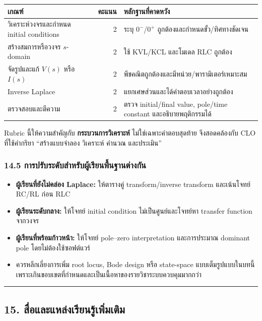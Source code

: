 \begin{table}[htbp]
    \centering
    \begin{tabularx}{\textwidth}{L{0.34\textwidth} r Y}
        \hline
        \textbf{เกณฑ์} & \textbf{คะแนน} & \textbf{หลักฐานที่คาดหวัง} \\
        \hline
        วิเคราะห์วงจรและกำหนด initial conditions & 2 & ระบุ $0^-$/$0^+$ ถูกต้องและกำหนดขั้ว/ทิศทางชัดเจน \\
        สร้างสมการหรือวงจร $s$-domain & 2 & ใช้ KVL/KCL และโมเดล RLC ถูกต้อง \\
        จัดรูปและแก้ $V(s)$ หรือ $I(s)$ & 2 & พีชคณิตถูกต้องและมีหน่วย/พารามิเตอร์เหมาะสม \\
        Inverse Laplace & 2 & แยกเศษส่วนและได้คำตอบเวลาอย่างถูกต้อง \\
        ตรวจสอบและตีความ & 2 & ตรวจ initial/final value, pole/time constant และอธิบายพฤติกรรมได้ \\
        \hline
    \end{tabularx}
\end{table}

Rubric นี้ให้ความสำคัญกับ \textbf{กระบวนการวิเคราะห์} ไม่ใช่เฉพาะคำตอบสุดท้าย จึงสอดคล้องกับ CLO ที่ใช้คำกริยา “สร้างแบบจำลอง วิเคราะห์ คำนวณ และประเมิน”

\subsubsection{14.5 การปรับระดับสำหรับผู้เรียนพื้นฐานต่างกัน}

\begin{itemize}
    \item \textbf{ผู้เรียนที่ยังไม่คล่อง Laplace:} ให้ตารางคู่ transform/inverse transform และเน้นโจทย์ RC/RL ก่อน RLC
    \item \textbf{ผู้เรียนระดับกลาง:} ให้โจทย์ initial condition ไม่เป็นศูนย์และโจทย์หา transfer function จากวงจร
    \item \textbf{ผู้เรียนที่พร้อมก้าวหน้า:} ให้โจทย์ pole–zero interpretation และการประมาณ dominant pole โดยไม่ต้องใช้ซอฟต์แวร์
    \item ควรหลีกเลี่ยงการเพิ่ม root locus, Bode design หรือ state-space แบบเต็มรูปแบบในบทนี้ เพราะเกินขอบเขตที่กำหนดและเป็นเนื้อหาของรายวิชาระบบควบคุมมากกว่า
\end{itemize}

\par\noindent\rule{\textwidth}{0.4pt}\par

\subsection{15. สื่อและแหล่งเรียนรู้เพิ่มเติม}


